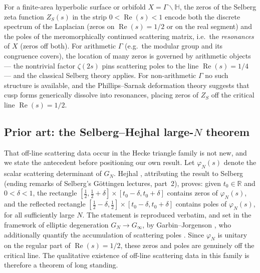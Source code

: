 \documentclass[11pt]{article}
\theoremstyle{definition}
\theoremstyle{remark}
\newcommand{\HH}{\mathbb{H}}
\renewcommand{\Re}{\operatorname{Re}}
\begin{document}
For a finite-area hyperbolic surface or orbifold $X = \Gamma\backslash\HH$,
the zeros of the Selberg zeta function $Z_S(s)$ in the strip
$0 < \Re(s) < 1$ encode both the discrete spectrum of the Laplacian
(zeros on $\Re(s) = 1/2$ or on the real segment) and the poles of the
meromorphically continued scattering matrix, i.e.\ the
\emph{resonances} of $X$ (zeros off both). For arithmetic $\Gamma$
(e.g.\ the modular group and its congruence covers), the location of
many zeros is governed by arithmetic objects --- the nontrivial factor
$\zeta(2s)$ pins scattering poles to the line $\Re(s) = 1/4$ --- and the
classical Selberg theory applies. For non-arithmetic $\Gamma$ no such
structure is available, and the Phillips--Sarnak deformation theory
\cite{PhillipsSarnak85,PhillipsSarnak85b} suggests that cusp forms
generically dissolve into resonances, placing zeros of $Z_S$ off the
critical line $\Re(s) = 1/2$.

\subsection{Prior art: the Selberg--Hejhal large-$N$ theorem}
\label{sec:priorart}

That off-line scattering data occur in the Hecke triangle family is not
new, and we state the antecedent before positioning our own result.
Let $\varphi_N(s)$ denote the scalar scattering determinant of $G_N$.
Hejhal \cite[Thm~7.11 and Cor.~7.12]{HejhalLNM1001}, attributing the
result to Selberg (ending remarks of Selberg's G\"ottingen lectures,
part~2), proves: given $t_0 \in \mathbb{R}$ and $0 < \delta < 1$, the
rectangle $[\tfrac12, \tfrac12+\delta]\times[t_0-\delta, t_0+\delta]$
contains zeros of $\varphi_N(s)$, and the reflected rectangle
$[\tfrac12-\delta, \tfrac12]\times[t_0-\delta, t_0+\delta]$ contains
poles of $\varphi_N(s)$, for all sufficiently large $N$. The statement
is reproduced verbatim, and set in the framework of elliptic
degeneration $G_N \to G_\infty$, by Garbin--Jorgenson
\cite[p.~162]{GarbinJorgenson18}, who additionally quantify the
accumulation of scattering poles
\cite[Thm~5.7, Rmk~5.8]{GarbinJorgenson18}. Since $\varphi_N$ is
unitary on the regular part of $\Re(s) = 1/2$, these zeros and poles
are genuinely off the critical line. The qualitative existence of
off-line scattering data in this family is therefore a theorem of long
standing.
\end{document}
